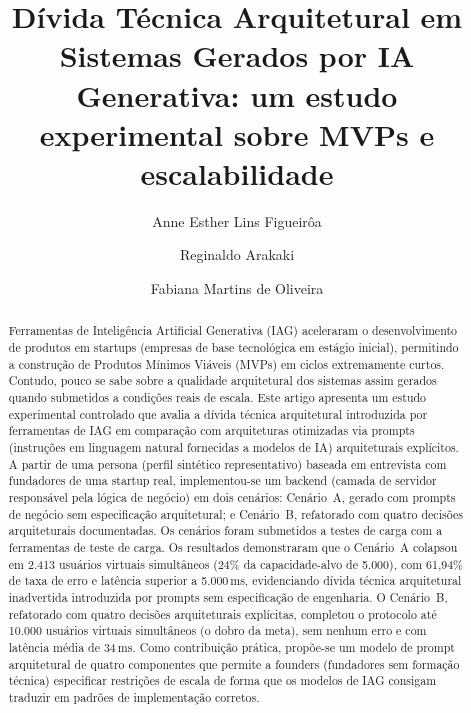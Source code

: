 \documentclass[sigconf]{acmart}
\begin{document}
\title{Dívida Técnica Arquitetural em Sistemas Gerados por IA Generativa: um estudo experimental sobre MVPs e escalabilidade}

\author{Anne Esther Lins Figueirôa}

\author{Reginaldo Arakaki}

\author{Fabiana Martins de Oliveira}

\renewcommand{\shortauthors}{Figueirôa et al.}
\renewcommand{\shorttitle}{Dívida Técnica Arquitetural em Soluções Geradas por IA}

\begin{abstract}
Ferramentas de Inteligência Artificial Generativa (IAG) aceleraram o desenvolvimento
de produtos em startups (empresas de base tecnológica em estágio inicial), permitindo
a construção de Produtos Mínimos Viáveis (MVPs) em ciclos extremamente curtos.
Contudo, pouco se sabe sobre a qualidade arquitetural dos sistemas assim gerados
quando submetidos a condições reais de escala. Este artigo apresenta um estudo
experimental controlado que avalia a dívida técnica arquitetural introduzida por
ferramentas de IAG em comparação com arquiteturas otimizadas via prompts
(instruções em linguagem natural fornecidas a modelos de IA) arquiteturais explícitos.
A partir de uma persona (perfil sintético representativo) baseada em entrevista com
fundadores de uma startup real, implementou-se um backend (camada de servidor
responsável pela lógica de negócio) em dois cenários: Cenário~A, gerado com prompts
de negócio sem especificação arquitetural; e Cenário~B, refatorado com quatro decisões
arquiteturais documentadas. Os cenários foram submetidos a testes de carga com a
ferramentas de teste de carga. Os resultados demonstraram que o Cenário~A colapsou em 2.413 usuários
virtuais simultâneos (24\% da capacidade-alvo de 5.000), com 61,94\% de taxa de
erro e latência superior a 5.000\,ms, evidenciando dívida técnica arquitetural
inadvertida introduzida por prompts sem especificação de engenharia. O Cenário~B,
refatorado com quatro decisões arquiteturais explícitas, completou o protocolo até
10.000 usuários virtuais simultâneos (o dobro da meta), sem nenhum erro e com
latência média de 34\,ms. Como contribuição prática, propõe-se um modelo de prompt arquitetural
de quatro componentes que permite a founders (fundadores sem formação técnica)
especificar restrições de escala de forma que os modelos de IAG consigam traduzir em
padrões de implementação corretos.
\end{abstract}
\end{document}
